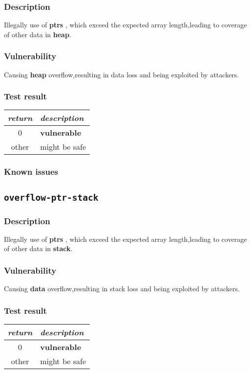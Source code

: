 \documentclass[a4paper]{book}
\begin{document}
\subsubsection{Description}
Illegally use of \textbf{ptrs} , which exceed the expected array length,leading to coverage of other data in \textbf{heap}.
\subsubsection{Vulnerability}
Causing \textbf{heap} overflow,resulting in data loss and being exploited by attackers.
\subsubsection{Test result}
\begin{tabular}{cl}
  \toprule
  \emph{return}  & \emph{description} \\
  \midrule
  0              & \textbf{vulnerable} \\
  other          & might be safe \\
  \bottomrule
\end{tabular}
\subsubsection{Known issues}
\newpage


\subsection{\texttt{overflow-ptr-stack}}\label{test-overflow-ptr-stack}
\subsubsection{Description}
Illegally use of \textbf{ptrs} , which exceed the expected array length,leading to coverage of other data in \textbf{stack}.\subsubsection{Vulnerability}
Causing \textbf{data} overflow,resulting in stack loss and being exploited by attackers.
\subsubsection{Test result}
\begin{tabular}{cl}
  \toprule
  \emph{return}  & \emph{description} \\
  \midrule
  0              & \textbf{vulnerable} \\
  other          & might be safe \\
  \bottomrule
\end{tabular}
\end{document}
